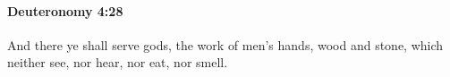
		\paragraph{Deuteronomy 4:28} %
			\label{DEUTERONOMY-4-28}

			And there ye shall serve gods, the work of men's hands, wood and stone, which neither see, nor hear, nor eat, nor smell.


